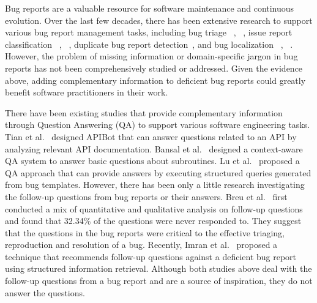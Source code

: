 Bug reports are a valuable resource for software maintenance and continuous evolution. Over the last few decades, there has been extensive research to support various bug report management tasks, including bug triage ~\cite{zhao2019unified}, ~\cite{bodden2017proceedings}, issue report classification ~\cite{thung2012automatic}, ~\cite{nayrolles2018towards}, duplicate bug report detection~\cite{nguyen2012duplicate, chaparro2019reformulating}, and bug localization ~\cite{zhang2019finelocator}, ~\cite{xiao2019improving}. However, the problem of missing information or domain-specific jargon in bug reports has not been comprehensively studied or addressed. Given the evidence above, adding complementary information to deficient bug reports could greatly benefit software practitioners in their work.\par

There have been existing studies that provide complementary information through Question Answering (QA) to support various software engineering tasks. Tian et al.~\cite{tian2017apibot} designed APIBot that can answer questions related to an API by analyzing relevant API documentation. Bansal et al.~\cite{bansal2021neural} designed a context-aware QA system to answer basic questions about subroutines. Lu et al.~\cite{lu2021beat} proposed a QA approach that can provide answers by executing structured queries generated from bug templates. However, there has been only a little research investigating the follow-up questions from bug reports or their answers. Breu et al.~\cite{breu2010information} first conducted a mix of quantitative and qualitative analysis on follow-up questions and found that 32.34\% of the questions were never responded to. They suggest that the questions in the bug reports were critical to the effective triaging, reproduction and resolution of a bug. Recently, Imran et al.~\cite{imran2021automatically} proposed a technique that recommends follow-up questions against a deficient bug report using structured information retrieval. Although both studies above deal with the follow-up questions from a bug report and are a source of inspiration, they do not answer the questions.\par

